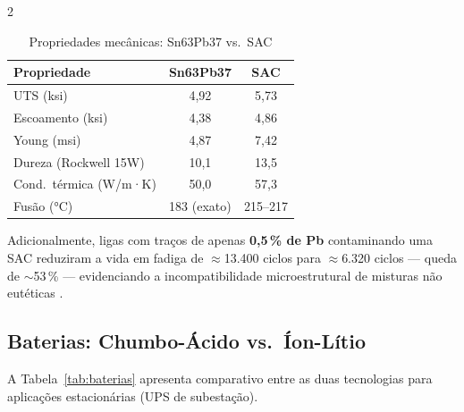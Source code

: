 \documentclass[12pt]{article}
\begin{document}
\begin{multicols}{2}
\begin{table}[H]
\centering
\caption{Propriedades mecânicas: Sn63Pb37 vs.\ SAC}
\label{tab:soldas}
\footnotesize
\begin{tabular}{lcc}
\toprule
\textbf{Propriedade}         & \textbf{Sn63Pb37} & \textbf{SAC} \\
\midrule
UTS (ksi)                    & 4,92              & 5,73         \\
Escoamento (ksi)             & 4,38              & 4,86         \\
Young (msi)                  & 4,87              & 7,42         \\
Dureza (Rockwell 15W)        & 10,1              & 13,5         \\
Cond.\ térmica (W/m·K)      & 50,0              & 57,3         \\
Fusão (°C)                   & 183 (exato)       & 215--217     \\
\bottomrule
\end{tabular}
\end{table}

Adicionalmente, ligas com traços de apenas \textbf{0,5\,\% de Pb} contaminando uma
SAC reduziram a vida em fadiga de $\approx$13.400 ciclos para $\approx$6.320 ciclos —
queda de $\sim$53\,\% — evidenciando a incompatibilidade microestrutural de misturas
não eutéticas \cite{ref_p2infohouse}.

\subsection{Baterias: Chumbo-Ácido vs.\ Íon-Lítio}

A Tabela~\ref{tab:baterias} apresenta comparativo entre as duas tecnologias para
aplicações estacionárias (UPS de subestação).

\begin{table}[H]
\centering
\caption{Comparativo chumbo-ácido vs.\ íon-lítio (uso estacionário)}
\label{tab:baterias}
\end{table}


\end{multicols}
\end{document}
